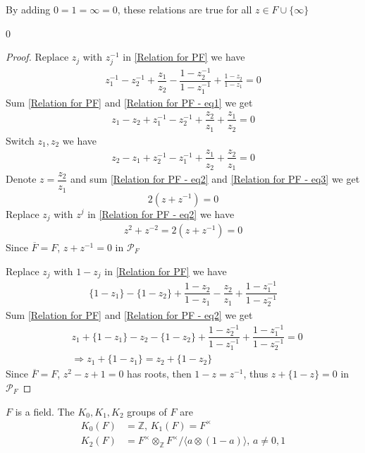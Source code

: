 \documentclass[../main.tex]{subfiles}
\def\CROP{1}
\begin{document}
\begin{remark}
By adding $0=1=\infty=0$, these relations are true for all $z\in F\cup\{\infty\}$
\end{remark}

\if\CROP0
\begin{proof}
Replace $z_j$ with $z_j^{-1}$ in \eqref{Relation for PF} we have
\begin{align}\label{Relation for PF - eq1}
z_1^{-1}-z_2^{-1}+\dfrac{z_1}{z_2}-\dfrac{1-z_2^{-1}}{1-z_1^{-1}}+\frac{1-z_2}{1-z_1}=0
\end{align}
Sum \eqref{Relation for PF} and \eqref{Relation for PF - eq1} we get
\begin{align}\label{Relation for PF - eq2}
z_1-z_2+z_1^{-1}-z_2^{-1}+\dfrac{z_2}{z_1}+\dfrac{z_1}{z_2}=0
\end{align}
Switch $z_1,z_2$ we have
\begin{align}\label{Relation for PF - eq3}
z_2-z_1+z_2^{-1}-z_1^{-1}+\dfrac{z_1}{z_2}+\dfrac{z_2}{z_1}=0
\end{align}
Denote $z=\dfrac{z_2}{z_1}$ and sum \eqref{Relation for PF - eq2} and \eqref{Relation for PF - eq3} we get
\[2(z+z^{-1})=0\]
Replace $z_j$ with $z^j$ in \eqref{Relation for PF - eq2} we have
\begin{align*}
z^2+z^{-2}=2(z+z^{-1})=0
\end{align*}
Since $\overline F=F$, $z+z^{-1}=0$ in $\mathcal P_F$ \par
Replace $z_j$ with $1-z_j$ in \eqref{Relation for PF} we have
\begin{align}\label{Relation for PF - eq4}
\{1-z_1\}-\{1-z_2\}+\dfrac{1-z_2}{1-z_1}-\dfrac{z_2}{z_1}+\dfrac{1-z_1^{-1}}{1-z_2^{-1}}
\end{align}
Sum \eqref{Relation for PF} and \eqref{Relation for PF - eq2} we get
\begin{align*}
&z_1+\{1-z_1\}-z_2-\{1-z_2\}+\dfrac{1-z_2^{-1}}{1-z_1^{-1}}+\dfrac{1-z_1^{-1}}{1-z_2^{-1}}=0 \\
&\Rightarrow z_1+\{1-z_1\}=z_2+\{1-z_2\}
\end{align*}
Since $\overline F=F$, $z^2-z+1=0$ has roots, then $1-z=z^{-1}$, thus $z+\{1-z\}=0$ in $\mathcal P_F$
\end{proof}
\fi

\begin{theorem}
$F$ is a field. The $K_0,K_1,K_2$ groups of $F$ are
\begin{align*}
K_0(F)&=\mathbb Z,\, K_1(F)=F^\times \\
K_2(F)&=F^\times\otimes_{\mathbb Z} F^\times/\langle a\otimes(1-a)\rangle,\,a\neq0,1
\end{align*}
\end{theorem}
\end{document}
